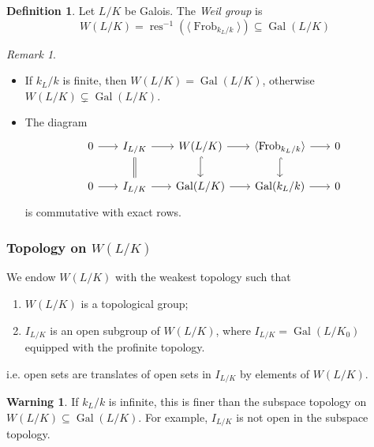 \documentclass[11pt]{article}
\theoremstyle{definition}
\newtheorem{definition}{Definition}[subsection]
\newtheorem*{warning}{Warning}
\theoremstyle{plain}
\theoremstyle{remark}
\newtheorem*{remark}{Remark}
\DeclareMathOperator{\Gal}{Gal}
\DeclareMathOperator{\res}{res}
\DeclareMathOperator{\Frob}{Frob}
\begin{document}
\begin{definition}\label{def:16_7}
    Let $L/K$ be Galois. The \emph{Weil group} is
    \begin{equation*}
        W(L/K) = \res^{-1}(\langle \Frob_{k_L/k} \rangle) \subseteq \Gal(L/K)
    \end{equation*}
\end{definition}

\begin{remark}\phantom{}
    \begin{itemize}
        \item If $k_L/k$ is finite, then $W(L/K) = \Gal(L/K)$, otherwise $W(L/K) \subsetneq \Gal(L/K)$.
        \item The diagram
            \begin{equation*}
            \begin{tikzcd}[column sep=scriptsize]
                0 \arrow[r] & I_{L/K} \arrow[r] \arrow[d, equal] & W(L/K) \arrow[r] \arrow[d, hookrightarrow] & \langle \Frob_{k_L/k} \rangle \arrow[r] \arrow[d, hookrightarrow] & 0\\
                0 \arrow[r] & I_{L/K} \arrow[r] & \Gal(L/K) \arrow[r] & \Gal(k_L/k) \arrow[r] & 0
            \end{tikzcd}
            \end{equation*}
            is commutative with exact rows.
    \end{itemize}
\end{remark}

\subsubsection*{Topology on $W(L/K)$}
We endow $W(L/K)$ with the weakest topology such that
\begin{enumerate}
    \item $W(L/K)$ is a topological group;
    \item $I_{L/K}$ is an open subgroup of $W(L/K)$, where $I_{L/K} = \Gal(L/K_0)$ equipped with the profinite topology.
\end{enumerate}
i.e. open sets are translates of open sets in $I_{L/K}$ by elements of $W(L/K)$.

\begin{warning}
    If $k_L/k$ is infinite, this is finer than the subspace topology on $W(L/K) \subseteq \Gal(L/K)$. For example, $I_{L/K}$ is not open in the subspace topology.
\end{warning}
\end{document}

